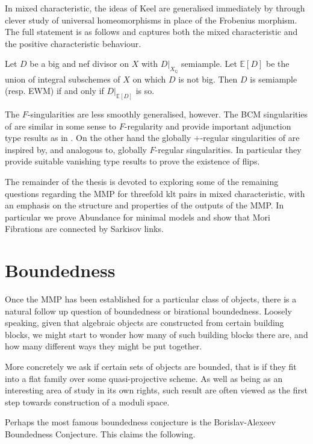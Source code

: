 \documentclass[a4paper,12pt]{book}
\begin{document}
	In mixed characteristic, the ideas of Keel are generalised immediately by \cite{} through clever study of universal homeomorphisms in place of the Frobenius morphism. The full statement is as follows and captures both the mixed characteristic and the positive characteristic behaviour.
	
	\begin{theorem*}
		Let $D$ be a big and nef divisor on $X$ with $D|_{X_{\mathbb{Q}}}$ semiample. Let $\mathbb{E}[D]$ be the union of integral subschemes of $X$ on which $D$ is not big. Then $D$ is semiample (resp. EWM) if and only if $D|_{\mathbb{E}[D]}$ is so.
	\end{theorem*}
	
	The $F$-singularities are less smoothly generalised, however. The BCM singularities of \cite{} are similar in some sense to $F$-regularity and provide important adjunction type results as in \cite{}. On the other hand the globally $+$-regular singularities of \cite{} are inspired by, and analogous to, globally $F$-regular singularities. In particular they provide suitable vanishing type results to prove the existence of flips. 
	
	The remainder of the thesis is devoted to exploring some of the remaining questions regarding the MMP for threefold klt pairs in mixed characteristic, with an emphasis on the structure and properties of the outputs of the MMP. In particular we prove Abundance for minimal models and show that Mori Fibrations are connected by Sarkisov links.	

	\section{Boundedness}
	
	Once the MMP has been established for a particular class of objects, there is a natural follow up question of boundedness or birational boundedness. Loosely speaking, given that algebraic objects are constructed from certain building blocks, we might start to wonder how many of such building blocks there are, and how many different ways they might be put together.
	
	More concretely we ask if certain sets of objects are bounded, that is if they fit into a flat family over some quasi-projective scheme. As well as being as an interesting area of study in its own rights, such result are often viewed as the first step towards construction of a moduli space.
	
	Perhaps the most famous boundedness conjecture is the Borislav-Alexeev Boundedness Conjecture. This claims the following.
	
\end{document}
